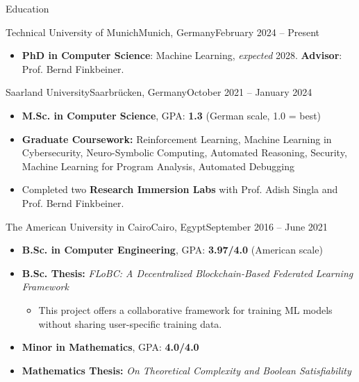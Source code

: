 \documentclass[]{mcdowellcv}
\begin{document}
	\begin{cvsection}{Education}
    \begin{cvsubsection}{Technical University of Munich}{Munich, Germany}{February 2024 -- Present}
			\begin{itemize}
				\item \textbf{PhD in Computer Science}: Machine Learning, \textit{expected} 2028. \textbf{Advisor}: Prof. Bernd Finkbeiner.
			\end{itemize}
		\end{cvsubsection}
		\begin{cvsubsection}{Saarland University}{Saarbrücken, Germany}{October 2021 -- January 2024}
			\begin{itemize}
				\item \textbf{M.Sc. in Computer Science}, GPA: \textbf{1.3} (German scale, 1.0 = best)
				\item \textbf{Graduate Coursework:} Reinforcement Learning, Machine Learning in Cybersecurity, Neuro-Symbolic Computing, Automated Reasoning, Security, Machine Learning for Program Analysis, Automated Debugging 
				\item Completed two \textbf{Research Immersion Labs} with Prof. Adish Singla and Prof. Bernd Finkbeiner.
			\end{itemize}
		\end{cvsubsection}
  
            \begin{cvsubsection}{The American University in Cairo}{Cairo, Egypt}{September 2016 -- June 2021}
			\begin{itemize}
				\item \textbf{B.Sc. in Computer Engineering}, GPA: \textbf{3.97/4.0} (American scale)
                    \item \textbf{B.Sc. Thesis:} \textit{FLoBC: A Decentralized Blockchain-Based Federated Learning Framework}
                    \begin{itemize}
                        \item This project offers a collaborative framework for training ML models without sharing user-specific training data.
                    \end{itemize}
                    \item \textbf{Minor in Mathematics}, GPA: \textbf{4.0/4.0}
				\item \textbf{Mathematics Thesis:} \textit{On Theoretical Complexity and Boolean Satisfiability}
			\end{itemize}
		\end{cvsubsection}
	\end{cvsection}
\end{document}
